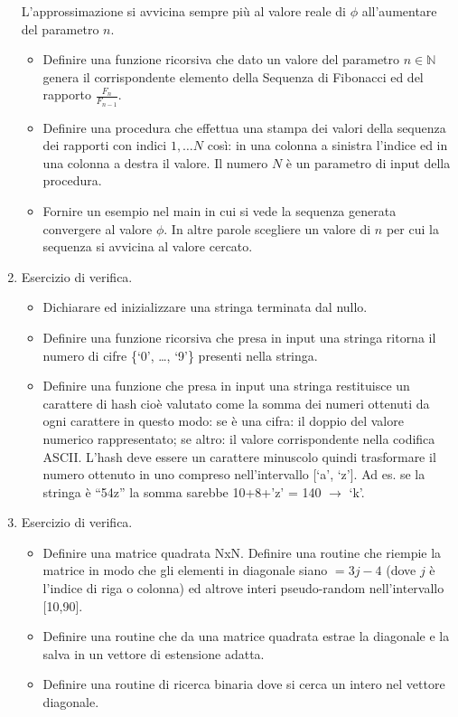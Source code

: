 \documentclass{article}
\begin{document}
\begin{enumerate}
L'approssimazione si avvicina sempre più al valore reale di $\phi$ all'aumentare del parametro $n$.

	\begin{itemize}
	\item Definire una funzione ricorsiva che dato un valore del parametro $n \in \mathbb{N}$ genera il corrispondente elemento della Sequenza di Fibonacci ed del rapporto $\frac{F_{n}}{F_{n-1}}$.
	\item Definire una procedura che effettua una stampa dei valori della sequenza dei rapporti con indici $1,\ldots N$ così: in una colonna a sinistra l'indice ed in una colonna a destra il valore. Il numero $N$ è un parametro di input della procedura.
	\item Fornire un esempio nel main in cui si vede la sequenza generata convergere al valore $\phi$. In altre parole scegliere un valore di $n$ per cui la sequenza si avvicina al valore cercato.
	\end{itemize}
	
	
\item Esercizio di verifica.

	\begin{itemize}
	\item Dichiarare ed inizializzare una stringa terminata dal nullo.
	\item Definire una funzione ricorsiva che presa in input una stringa ritorna il numero di cifre \{‘0’, …, ‘9’\} presenti nella stringa.
	\item Definire una funzione che presa in input una stringa restituisce un carattere di hash cioè valutato come la somma dei numeri ottenuti da ogni carattere in questo modo: se è una cifra: il doppio del valore numerico rappresentato; se altro: il valore corrispondente nella codifica ASCII. L’hash deve essere un carattere minuscolo quindi trasformare il numero ottenuto in uno compreso nell’intervallo [‘a’, ‘z’]. Ad es. se la stringa è “54z” la somma sarebbe 10+8+’z’ = 140 $\rightarrow$ ‘k’.
	\end{itemize}
	
\item Esercizio di verifica.

	\begin{itemize}
	\item Definire una matrice quadrata NxN. Definire una routine che riempie la matrice in modo che gli elementi in diagonale siano $= 3j - 4$ (dove $j$ è l'indice di riga o colonna) ed altrove interi pseudo-random nell’intervallo [10,90].
	\item Definire una routine che da una matrice quadrata estrae la diagonale e la salva in un vettore di estensione adatta.
    	\item Definire una routine di ricerca binaria dove si cerca un intero nel vettore diagonale.
    	\end{itemize}
\end{enumerate}
\end{document}
